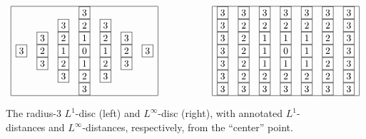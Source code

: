 \begin{figure}[hbt]
\[
\begin{array}{ccc}
\begin{array}{|ccccccc|}
\hline
  &   &   & \fbox{3} &   &   &   \\
  &   & \fbox{3} & \fbox{2} & \fbox{3} &   &   \\
  & \fbox{3} & \fbox{2} & \fbox{1} & \fbox{2} & \fbox{3} &   \\
\fbox{3} & \fbox{2} & \fbox{1} & \fbox{0} & \fbox{1} & \fbox{2} & \fbox{3} \\
  & \fbox{3} & \fbox{2} & \fbox{1} & \fbox{2} & \fbox{3} &   \\
  &   & \fbox{3} & \fbox{2} & \fbox{3} &   &   \\
  &   &   & \fbox{3} &   &   &   \\
\hline
\end{array}
  & \hspace*{.5in} &
\begin{array}{|ccccccc|}
\hline
\fbox{3} & \fbox{3} & \fbox{3} & \fbox{3} & \fbox{3} & \fbox{3} & \fbox{3} \\
\fbox{3} & \fbox{2} & \fbox{2} & \fbox{2} & \fbox{2} & \fbox{2} & \fbox{3} \\
\fbox{3} & \fbox{2} & \fbox{1} & \fbox{1} & \fbox{1} & \fbox{2} & \fbox{3} \\
\fbox{3} & \fbox{2} & \fbox{1} & \fbox{0} & \fbox{1} & \fbox{2} & \fbox{3} \\
\fbox{3} & \fbox{2} & \fbox{1} & \fbox{1} & \fbox{1} & \fbox{2} & \fbox{3} \\
\fbox{3} & \fbox{2} & \fbox{2} & \fbox{2} & \fbox{2} & \fbox{2} & \fbox{3} \\
\fbox{3} & \fbox{3} & \fbox{3} & \fbox{3} & \fbox{3} & \fbox{3} & \fbox{3} \\
\hline
\end{array}
\end{array}
\]
\caption{The radius-$3$ $L^1$-disc (left) and $L^\infty$-disc (right),
  with annotated $L^1$-distances and $L^\infty$-distances,
  respectively, from the ``center'' point.}
\label{fig:Ln-discs}
\end{figure}

\medskip

